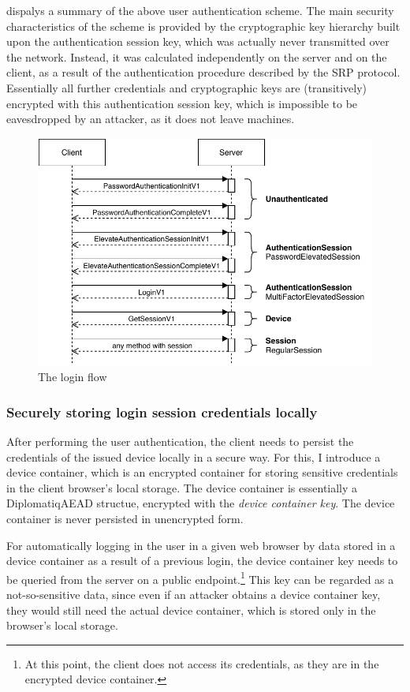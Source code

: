  dispalys a summary of the above user authentication scheme. The main security characteristics of the scheme is provided by the cryptographic key hierarchy built upon the authentication session key, which was actually never transmitted over the network. Instead, it was calculated independently on the server and on the client, as a result of the authentication procedure described by the SRP protocol. Essentially all further credentials and cryptographic keys are (transitively) encrypted with this authentication session key, which is impossible to be eavesdropped by an attacker, as it does not leave machines.

\begin{figure}[!htb]
    \centering
    \includegraphics[width=\textwidth-1cm]{figures/login.pdf}
    \caption{The login flow}
    \label{fig:login}
\end{figure}

\subsubsection{Securely storing login session credentials locally}

After performing the user authentication, the client needs to persist the credentials of the issued device locally in a secure way. For this, I introduce a device container, which is an encrypted container for storing sensitive credentials in the client browser's local storage. The device container is essentially a DiplomatiqAEAD structue, encrypted with the \emph{device container key}. The device container is never persisted in unencrypted form.

For automatically logging in the user in a given web browser by data stored in a device container as a result of a previous login, the device container key needs to be queried from the server on a public endpoint.\footnote{At this point, the client does not access its credentials, as they are in the encrypted device container.} This key can be regarded as a not-so-sensitive data, since even if an attacker obtains a device container key, they would still need the actual device container, which is stored only in the browser's local storage.

